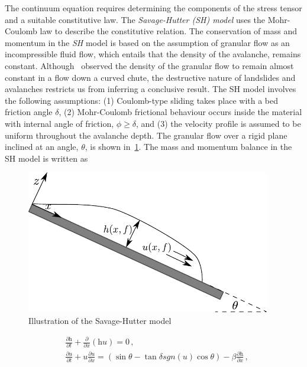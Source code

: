 The continuum equation requires determining the components of the stress tensor 
and a suitable constitutive law. The \textit{Savage-Hutter (SH) model} uses the 
Mohr-Coulomb law to describe the constitutive relation. The conservation of 
mass and momentum in the \textit{SH} model is based on the assumption of 
granular flow as an incompressible fluid flow, which entails that the density 
of the avalanche, remains constant. 
Although~\citet{Hutter1995} observed the density of the granular flow to remain 
almost constant in a flow down a curved chute, the destructive nature of 
landslides and avalanches restricts us from inferring a conclusive result. The 
SH model involves the following assumptions: (1) Coulomb-type sliding takes 
place with a bed friction angle $\delta$, (2) Mohr-Coulomb frictional behaviour 
occurs inside the material with internal angle of friction, $\phi \ge \delta$, 
and (3) the velocity profile is assumed to be uniform throughout the avalanche 
depth. The granular flow over a rigid plane inclined at an angle, $\theta$, is 
shown in~\cref{fig:SH}. The mass and momentum balance in the SH model is 
written as
%
\begin{figure}[htbp]
\centering
\includegraphics[width=0.95\textwidth]{SH}
\caption{Illustration of the Savage-Hutter model}
\label{fig:SH}
\end{figure}
%
\begin{align}
&\frac{\partial \textit{h}}{\partial \textit{t}} + \frac{\partial}{\partial 
\textit{x}} (\textit{hu})  =  0 \,, \\
&\frac{\partial \textit{u}}{\partial \textit{t}} + \textit{u} \frac{\partial 
\textit{u}}{\partial \textit{x}}  = (\sin \theta - \tan \delta 
\textit{sgn}(\textit{u}) \cos \theta) -\beta \frac{\partial 
\textit{h}}{\partial \textit{x}} \,,
\end{align}
